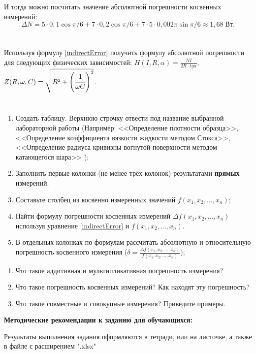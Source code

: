 \documentclass[14pt,a4paper]{article}
\begin{document}
И тогда можно посчитать значение абсолютной погрешности косвенных измерений:
\begin{equation}
    \Delta N = 5 \cdot 0,1 \cos{\pi/6} + 7\cdot 0,2\cos{\pi/6} + 7\cdot 5 \cdot 0,002\pi\sin{\pi/6} \approx 1,68\;\text{Вт}.
\end{equation}
\progress{}
\section{}
Используя формулу \ref{indirectError} получить формулу абсолютной погрешности для следующих физических зависимостей:
$H(I,R,\alpha) = \frac{NI}{2R\cdot tg\alpha}$, $Z(R,\omega, C) = \sqrt{R^2+\left (\cfrac{1}{\omega C} \right )^2}$. \\
\section{}
\begin{enumerate}
    \item Создать таблицу. Верхнюю строчку отвести под название выбранной лабораторной работы (Например: <<Определение плотности образца>>, <<Определение  коэффициента вязкости жидкости  методом Стокса>>, <<Определение радиуса кривизны вогнутой поверхности методом катающегося шара>> );
    \item Заполнить первые колонки (не менее трёх колонок) результатами \textbf{прямых} измерений.
    \item Составьте столбец из косвенно измеренных значений $f(x_1, x_2, \ldots, x_n)$;
    \item Найти формулу погрешности косвенных измерений $\Delta f(x_1, x_2, \ldots, x_n)$ используя уравнение \ref{indirectError} и $f(x_1, x_2, \ldots, x_n)$. 
    \item В отдельных колонках по формулам рассчитать абсолютную и относительную погрешность косвенного измерения ($\delta  = \frac{\Delta f(x_1, x_2, \ldots, x_n)}{f(x_1, x_2, \ldots, x_n)}$);
\end{enumerate}

\questions{}
\begin{enumerate}
    \item Что такое аддитивная и мультипликативная погрешность измерения?
    \item Что такое погрешность косвенных измерений? Как находят эту погрешность?
    \item Что такое совместные и совокупные измерения? Приведите примеры.
\end{enumerate}

\textbf{Методические рекомендации к заданию для обучающихся:} 

Результаты выполнения задания оформляются в тетради, или на листочке, а также в файле с расширением ".xlsx"
% 
\end{document}
